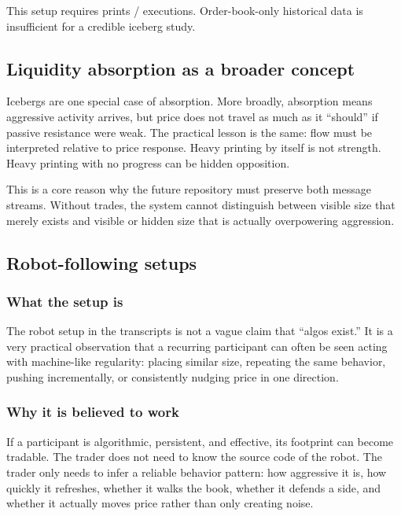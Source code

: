This setup requires prints / executions. Order-book-only historical data is insufficient for a
credible iceberg study.

\subsection{Liquidity absorption as a broader concept}

Icebergs are one special case of absorption. More broadly, absorption means aggressive activity
arrives, but price does not travel as much as it ``should'' if passive resistance were weak.
The practical lesson is the same: flow must be interpreted relative to price response. Heavy
printing by itself is not strength. Heavy printing with no progress can be hidden opposition.

This is a core reason why the future repository must preserve both message streams. Without
trades, the system cannot distinguish between visible size that merely exists and visible or
hidden size that is actually overpowering aggression.

\subsection{Robot-following setups}

\subsubsection{What the setup is}

The robot setup in the transcripts is not a vague claim that ``algos exist.'' It is a very
practical observation that a recurring participant can often be seen acting with machine-like
regularity: placing similar size, repeating the same behavior, pushing incrementally, or
consistently nudging price in one direction.

\subsubsection{Why it is believed to work}

If a participant is algorithmic, persistent, and effective, its footprint can become tradable.
The trader does not need to know the source code of the robot. The trader only needs to infer a
reliable behavior pattern: how aggressive it is, how quickly it refreshes, whether it walks the
book, whether it defends a side, and whether it actually moves price rather than only creating
noise.

